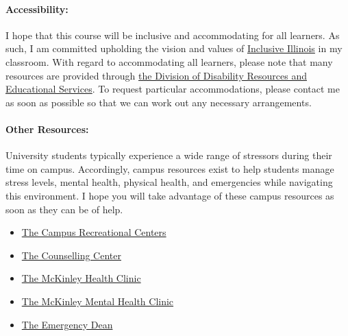 \documentclass[11pt, a4paper]{article}
\begin{document}
\paragraph{Accessibility:} I hope that this course will be inclusive and
accommodating for all learners. As such, I am committed upholding the vision
and values of \href{http://www.inclusiveillinois.illinois.edu/index.html}{Inclusive Illinois}
in my
classroom.  With regard to accommodating all learners, please note that many
resources are provided through
\href{http://disability.illinois.edu/academic-support/accommodations}{the
Division of Disability Resources and Educational Services}.  To request
particular accommodations, please contact me as soon as possible so that we can
work out any necessary arrangements.

\paragraph{Other Resources:}
University students typically experience a wide range of stressors during their
time on campus. Accordingly, campus resources exist to help students manage
stress levels, mental health, physical health, and emergencies while navigating
this environment. I hope you will take advantage of these campus resources as
soon as they can be of help.

\begin{itemize}
\item \href{https://campusrec.illinois.edu/}{The Campus Recreational Centers}
\item \href{http://counselingcenter.illinois.edu/}{The Counselling Center}
\item \href{https://mckinley.illinois.edu/}{The McKinley Health Clinic}
\item \href{http://www.mckinley.illinois.edu/medical-services/mental-health}{The McKinley Mental Health Clinic}
\item \href{https://odos.illinois.edu/community-of-care/emergency-dean/}{The Emergency Dean}
\end{itemize}
\end{document}
